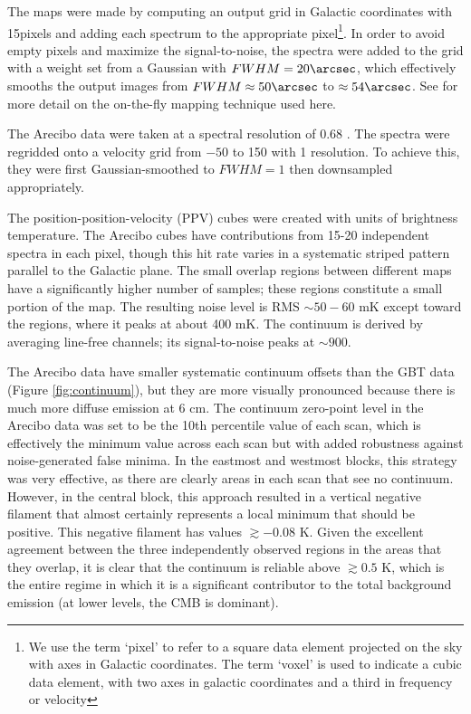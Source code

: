 The maps were made by computing an output grid in Galactic coordinates with
15\arcsec pixels and adding each spectrum to the appropriate pixel\footnote{We
use the term `pixel' to refer to a square data element projected on the sky
with axes in Galactic coordinates.  The term `voxel' is used to indicate a cubic data
element, with two axes in galactic coordinates and a third in frequency or
velocity}.  In order
to avoid empty pixels and maximize the signal-to-noise, the spectra were added
to the grid with a weight set from a Gaussian with $FWHM=20\arcsec$, which
effectively smooths the output images from $FWHM\approx50\arcsec$ to
$\approx54\arcsec$.  See \citet{Mangum2007a} for more detail on the on-the-fly
mapping technique used here.

The Arecibo data were taken at a spectral resolution of 0.68 \kms.  The
spectra were regridded onto a velocity grid from $-50$ to 150 \kms with 1 \kms
resolution.  To achieve this, they were first Gaussian-smoothed to $FWHM=1$
\kms then downsampled appropriately.

The position-position-velocity (PPV) cubes were created with units of
brightness temperature.  The Arecibo cubes have contributions from 15-20
independent spectra in each pixel, though
this hit rate varies in a systematic striped pattern parallel to the Galactic
plane.  The small overlap regions between different maps have a significantly
higher number of samples; these regions constitute a small portion of the map.
The resulting noise level is RMS $\sim 50-60$ mK except toward the \hii
regions, where it peaks at about 400 mK.  The continuum is derived by averaging
line-free channels; its signal-to-noise peaks at $\sim900$.

The Arecibo data have smaller systematic continuum offsets than the GBT data
(Figure \ref{fig:continuum}), but they are more visually pronounced because
there is much more diffuse emission at 6 cm.  The continuum zero-point level in
the Arecibo data was set to be the 10th percentile value of each scan, which is
effectively the minimum value across each scan but with added robustness
against noise-generated false minima.  In the eastmost and westmost blocks,
this strategy was very effective, as there are clearly areas in each scan that
see no continuum.  However, in the central block, this approach resulted in a
vertical negative filament that almost certainly represents a local minimum
that should be positive.  This negative filament has values $\gtrsim-0.08$ K.
Given the excellent agreement between the three independently observed regions
in the areas that they overlap, it is clear that the continuum is reliable
above $\gtrsim0.5$ K, which is the entire regime in which it is a significant
contributor to the total background emission (at lower levels, the CMB is
dominant).

